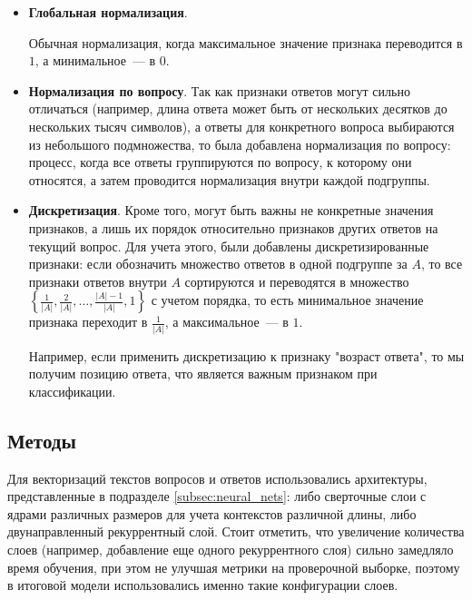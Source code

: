 \documentclass[../diploma.tex]{subfiles}
\begin{document}
	\begin{itemize}
		\item
		\textbf{Глобальная нормализация}.

	   	Обычная нормализация, когда максимальное значение признака переводится в $1$, а минимальное~--- в $0$.

	   	\item
	   	\textbf{Нормализация по вопросу}.
	   	Так как признаки ответов могут сильно отличаться (например, длина ответа может быть от нескольких десятков до нескольких тысяч символов), 
	   	а ответы для конкретного вопроса выбираются из небольшого подмножества, то была добавлена нормализация по вопросу: 
	   	процесс, когда все ответы группируются по вопросу, к которому они относятся, а затем проводится нормализация внутри каждой подгруппы.

	    \item
	    \textbf{Дискретизация}.
		Кроме того, могут быть важны не конкретные значения признаков, а лишь их порядок относительно признаков других ответов на текущий вопрос.
		Для учета этого, были добавлены дискретизированные признаки: 
		если обозначить множество ответов в одной подгруппе за $A$, 
		то все признаки ответов внутри $A$ сортируются и переводятся в множество $\left\{ \frac{1}{|A|}, \frac{2}{|A|}, \dots, \frac{|A| - 1}{|A|}, 1\right\}$ 
		с учетом порядка, то есть минимальное значение признака переходит в $\frac{1}{|A|}$, а максимальное~--- в $1$.

		Например, если применить дискретизацию к признаку "возраст ответа", то мы получим позицию ответа, что является важным признаком при классификации. 

	\end{itemize}

	\subsection{Методы}

	\label{sec:methods}

	Для векторизаций текстов вопросов и ответов использовались архитектуры, представленные в подразделе \ref{subsec:neural_nets}: 
	либо сверточные слои с ядрами различных размеров для учета контекстов различной длины, либо двунаправленный рекуррентный слой.
	Стоит отметить, что увеличение количества слоев (например, добавление еще одного рекуррентного слоя) сильно замедляло время обучения, 
	при этом не улучшая метрики на проверочной выборке, поэтому в итоговой модели использовались именно такие конфигурации слоев.
\end{document}
